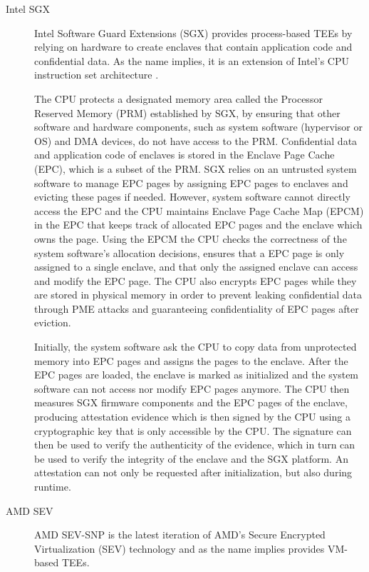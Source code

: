 \begin{description}
  \item[Intel SGX]
    Intel Software Guard Extensions (SGX) provides process-based TEEs by relying
    on hardware to create enclaves that contain application code and
    confidential data. As the name implies, it is an extension of Intel's CPU
    instruction set architecture \cite{costan2016sgx}.

    The CPU protects a designated memory area called the Processor Reserved
    Memory (PRM) established by SGX, by ensuring that other software and
    hardware components, such as system software (hypervisor or OS) and DMA
    devices, do not have access to the PRM. Confidential data and application
    code of enclaves is stored in the Enclave Page Cache (EPC), which is a
    subset of the PRM. SGX relies on an untrusted system software to manage EPC
    pages by assigning EPC pages to enclaves and evicting these pages if needed.
    However, system software cannot directly access the EPC and the CPU
    maintains Enclave Page Cache Map (EPCM) in the EPC that keeps track of
    allocated EPC pages and the enclave which owns the page. Using the EPCM the
    CPU checks the correctness of the system software's allocation decisions,
    ensures that a EPC page is only assigned to a single enclave, and that only
    the assigned enclave can access and modify the EPC page. The CPU also
    encrypts EPC pages while they are stored in physical memory in order to
    prevent leaking confidential data through PME attacks and guaranteeing
    confidentiality of EPC pages after eviction.

    Initially, the system software ask the CPU to copy data from unprotected
    memory into EPC pages and assigns the pages to the enclave. After the EPC
    pages are loaded, the enclave is marked as initialized and the system
    software can not access nor modify EPC pages anymore. The CPU then measures
    SGX firmware components and the EPC pages of the enclave, producing
    attestation evidence which is then signed by the CPU using a cryptographic
    key that is only accessible by the CPU. The signature can
    then be used to verify the authenticity of the evidence, which in turn can
    be used to verify the integrity of the enclave and the SGX platform. An
    attestation can not only be requested after initialization, but also during
    runtime.

  \item[AMD SEV]
    AMD SEV-SNP is the latest iteration of AMD's Secure Encrypted Virtualization
    (SEV) technology \cite{amd2021sev, amd2017seves, amd2020sevsnp} and as the
    name implies provides VM-based TEEs.


\end{description}
